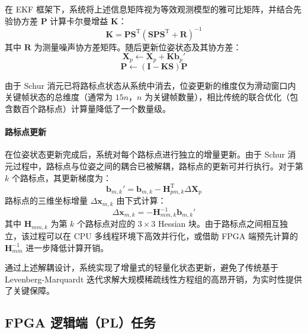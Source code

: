 在 EKF 框架下，系统将上述信息矩阵视为等效观测模型的雅可比矩阵，并结合先验协方差 $\mathbf{P}$ 计算卡尔曼增益 $\mathbf{K}$：
\begin{equation}
    \mathbf{K} = \mathbf{P} \mathbf{S}^{\mathrm{T}} (\mathbf{S} \mathbf{P} \mathbf{S}^{\mathrm{T}} + \mathbf{R})^{-1}
\end{equation}
其中 $\mathbf{R}$ 为测量噪声协方差矩阵。随后更新位姿状态及其协方差：
\begin{equation}
    \mathbf{X}_p \leftarrow \mathbf{X}_p + \mathbf{K} \mathbf{b}_p'
\end{equation}
\begin{equation}
    \mathbf{P} \leftarrow (\mathbf{I} - \mathbf{K} \mathbf{S}) \mathbf{P}
\end{equation}

由于 Schur 消元已将路标点状态从系统中消去，位姿更新的维度仅为滑动窗口内关键帧状态的总维度（通常为 $15n$，$n$ 为关键帧数量），相比传统的联合优化（包含数百个路标点）计算量降低了一个数量级。

\paragraph{路标点更新}
在位姿状态更新完成后，系统对每个路标点进行独立的增量更新。由于 Schur 消元过程中，路标点与位姿之间的耦合已被解耦，路标点的更新可并行执行。对于第 $k$ 个路标点，其更新梯度为：
\begin{equation}
    \mathbf{b}_{m,k}' = \mathbf{b}_{m,k} - \mathbf{H}_{pm,k}^{\mathrm{T}} \Delta \mathbf{X}_p
\end{equation}
路标点的三维坐标增量 $\Delta \mathbf{x}_{m,k}$ 由下式计算：
\begin{equation}
    \Delta \mathbf{x}_{m,k} = -\mathbf{H}_{mm,k}^{-1} \mathbf{b}_{m,k}'
\end{equation}
其中 $\mathbf{H}_{mm,k}$ 为第 $k$ 个路标点对应的 $3 \times 3$ Hessian 块。由于路标点之间相互独立，该过程可以在 CPU 多线程环境下高效并行化，或借助 FPGA 端预先计算的 $\mathbf{H}_{mm}^{-1}$ 进一步降低计算开销。

通过上述解耦设计，系统实现了增量式的轻量化状态更新，避免了传统基于 Levenberg-Marquardt 迭代求解大规模稀疏线性方程组的高昂开销，为实时性提供了关键保障。

\subsection{FPGA 逻辑端（PL）任务}

